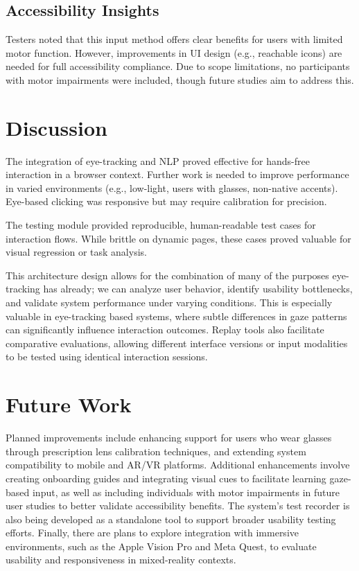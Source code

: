 \subsection{Accessibility Insights}

Testers noted that this input method offers clear benefits for users with limited motor function. However, improvements in UI design (e.g., reachable icons) are needed for full accessibility compliance. Due to scope limitations, no participants with motor impairments were included, though future studies aim to address this.


\section{Discussion}

The integration of eye-tracking and NLP proved effective for hands-free interaction in a browser context. Further work is needed to improve performance in varied environments (e.g., low-light, users with glasses, non-native accents). Eye-based clicking was responsive but may require calibration for precision.

The testing module provided reproducible, human-readable test cases for interaction flows. While brittle on dynamic pages, these cases proved valuable for visual regression or task analysis. 

This architecture design allows for the combination of many of the purposes eye-tracking has already; we can analyze user behavior, identify usability bottlenecks, and validate system performance under varying conditions. This is especially valuable in eye-tracking based systems, where subtle differences in gaze patterns can significantly influence interaction outcomes. Replay tools also facilitate comparative evaluations, allowing different interface versions or input modalities to be tested using identical interaction sessions.


\section{Future Work}

Planned improvements include enhancing support for users who wear glasses through prescription lens calibration techniques, and extending system compatibility to mobile and AR/VR platforms. Additional enhancements involve creating onboarding guides and integrating visual cues to facilitate learning gaze-based input, as well as including individuals with motor impairments in future user studies to better validate accessibility benefits. The system's test recorder is also being developed as a standalone tool to support broader usability testing efforts. Finally, there are plans to explore integration with immersive environments, such as the Apple Vision Pro and Meta Quest, to evaluate usability and responsiveness in mixed-reality contexts.
